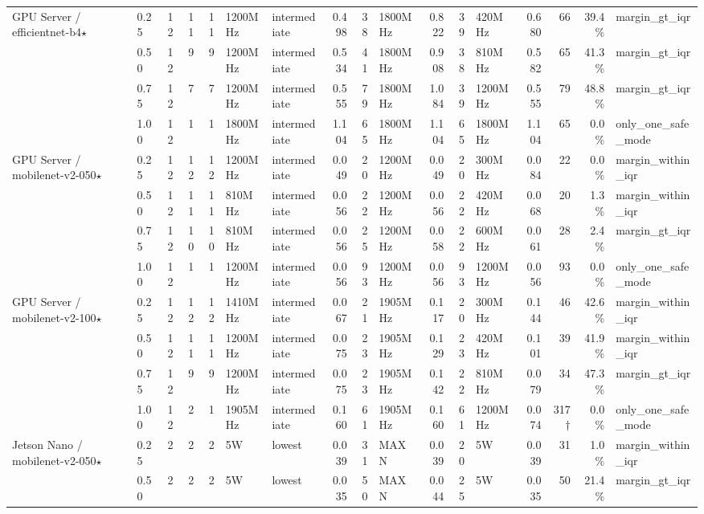 \documentclass[10pt]{article}
\begin{document}
\begin{center}
\begin{longtable}{@{}l l r r r l l r r l r r l r r r l@{}}
\midrule\endhead
GPU Server / efficientnet-b4$\star$ & 0.25 & 12 & 11 & 11 & 1200MHz & intermediate & 0.498 & 38 & 1800MHz & 0.822 & 39 & 420MHz & 0.680 & 66 & 39.4\% & margin\_gt\_iqr \\
 & 0.50 & 12 & 9 & 9 & 1200MHz & intermediate & 0.534 & 41 & 1800MHz & 0.908 & 38 & 810MHz & 0.582 & 65 & 41.3\% & margin\_gt\_iqr \\
 & 0.75 & 12 & 7 & 7 & 1200MHz & intermediate & 0.555 & 79 & 1800MHz & 1.084 & 39 & 1200MHz & 0.555 & 79 & 48.8\% & margin\_gt\_iqr \\
 & 1.00 & 12 & 1 & 1 & 1800MHz & intermediate & 1.104 & 65 & 1800MHz & 1.104 & 65 & 1800MHz & 1.104 & 65 & 0.0\% & only\_one\_safe\_mode \\
\addlinespace[2pt]
GPU Server / mobilenet-v2-050$\star$ & 0.25 & 12 & 12 & 12 & 1200MHz & intermediate & 0.049 & 20 & 1200MHz & 0.049 & 20 & 300MHz & 0.084 & 22 & 0.0\% & margin\_within\_iqr \\
 & 0.50 & 12 & 11 & 11 & 810MHz & intermediate & 0.056 & 22 & 1200MHz & 0.056 & 22 & 420MHz & 0.068 & 20 & 1.3\% & margin\_within\_iqr \\
 & 0.75 & 12 & 10 & 10 & 810MHz & intermediate & 0.056 & 25 & 1200MHz & 0.058 & 22 & 600MHz & 0.061 & 28 & 2.4\% & margin\_gt\_iqr \\
 & 1.00 & 12 & 1 & 1 & 1200MHz & intermediate & 0.056 & 93 & 1200MHz & 0.056 & 93 & 1200MHz & 0.056 & 93 & 0.0\% & only\_one\_safe\_mode \\
\addlinespace[2pt]
GPU Server / mobilenet-v2-100$\star$ & 0.25 & 12 & 12 & 12 & 1410MHz & intermediate & 0.067 & 21 & 1905MHz & 0.117 & 20 & 300MHz & 0.144 & 46 & 42.6\% & margin\_within\_iqr \\
 & 0.50 & 12 & 11 & 11 & 1200MHz & intermediate & 0.075 & 23 & 1905MHz & 0.129 & 23 & 420MHz & 0.101 & 39 & 41.9\% & margin\_within\_iqr \\
 & 0.75 & 12 & 9 & 9 & 1200MHz & intermediate & 0.075 & 23 & 1905MHz & 0.142 & 22 & 810MHz & 0.079 & 34 & 47.3\% & margin\_gt\_iqr \\
 & 1.00 & 12 & 2 & 1 & 1905MHz & intermediate & 0.160 & 61 & 1905MHz & 0.160 & 61 & 1200MHz & 0.074 & 317\,$\dagger$ & 0.0\% & only\_one\_safe\_mode \\
\addlinespace[2pt]
Jetson Nano / mobilenet-v2-050$\star$ & 0.25 & 2 & 2 & 2 & 5W & lowest & 0.039 & 31 & MAXN & 0.039 & 20 & 5W & 0.039 & 31 & 1.0\% & margin\_within\_iqr \\
 & 0.50 & 2 & 2 & 2 & 5W & lowest & 0.035 & 50 & MAXN & 0.044 & 25 & 5W & 0.035 & 50 & 21.4\% & margin\_gt\_iqr \\

\end{longtable}
\end{center}
\end{document}

